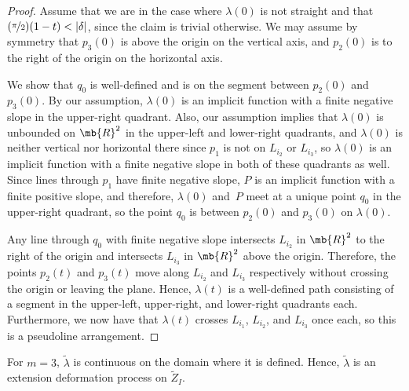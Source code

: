 \begin{proof}
Assume that we are in the case where $\lambda(0)$ is not straight and that \hbox{$(\nicefrac{\pi}{2})(1-t) < |\delta|$}, since the claim is trivial otherwise.
We may assume by symmetry that $p_3(0)$ is above the origin on the vertical axis, and $p_2(0)$ is to the right of the origin on the horizontal axis.

We show that $q_0$ is well-defined and is on the segment between $p_2(0)$ and $p_3(0)$.
By our assumption, $\lambda(0)$ is an implicit function with a finite negative slope in the upper-right quadrant.
Also, our assumption implies that $\lambda(0)$ is unbounded on $\mb{R}^2$ in the upper-left and lower-right quadrants, and $\lambda(0)$ is neither vertical nor horizontal there since $p_1$ is not on $L_{i_2}$ or $L_{i_3}$, so $\lambda(0)$ is an implicit function with a finite negative slope in both of these quadrants as well.
Since lines through $p_1$ have finite negative slope, $P$ is an implicit function with a finite positive slope, and therefore, $\lambda(0)$ and~$P$ meet at a unique point $q_0$ in the upper-right quadrant, so the point $q_0$ is between $p_2(0)$ and $p_3(0)$ on $\lambda(0)$.

Any line through $q_0$ with finite negative slope intersects $L_{i_2}$ in $\mb{R}^2$ to the right of the origin and intersects $L_{i_3}$ in $\mb{R}^2$ above the origin.
Therefore, the points $p_2(t)$ and $p_3(t)$ move along $L_{i_2}$ and $L_{i_3}$ respectively without crossing the origin or leaving the plane.
Hence, $\lambda(t)$ is a well-defined path consisting of a segment in the upper-left, upper-right, and lower-right quadrants each.
Furthermore, we now have that $\lambda(t)$ crosses $L_{i_1}$, $L_{i_2}$, and $L_{i_3}$ once each, so this is a pseudoline arrangement.
\end{proof}

\begin{claim}\label{claim-lambda-continuous-3}
For $m =3$, $\tilde \lambda$ is continuous on the domain where it is defined. Hence, $\tilde \lambda$ is an extension deformation process on $\tilde Z_I$.
\end{claim}


